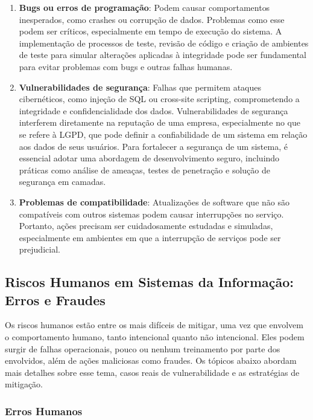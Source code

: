 \documentclass[12pt,oneside,a4paper,article]{abntex2}
\begin{document}
\begin{enumerate}
    \item \textbf{Bugs ou erros de programação}: Podem causar comportamentos inesperados, como crashes ou corrupção de dados. Problemas como esse podem ser críticos, especialmente em tempo de execução do sistema. A implementação de processos de teste, revisão de código e criação de ambientes de teste para simular alterações aplicadas à integridade pode ser fundamental para evitar problemas com bugs e outras falhas humanas.
    
    \item \textbf{Vulnerabilidades de segurança}: Falhas que permitem ataques cibernéticos, como injeção de SQL ou cross-site scripting, comprometendo a integridade e confidencialidade dos dados. Vulnerabilidades de segurança interferem diretamente na reputação de uma empresa, especialmente no que se refere à LGPD, que pode definir a confiabilidade de um sistema em relação aos dados de seus usuários. Para fortalecer a segurança de um sistema, é essencial adotar uma abordagem de desenvolvimento seguro, incluindo práticas como análise de ameaças, testes de penetração e solução de segurança em camadas.
    
    \item \textbf{Problemas de compatibilidade}: Atualizações de software que não são compatíveis com outros sistemas podem causar interrupções no serviço. Portanto, ações precisam ser cuidadosamente estudadas e simuladas, especialmente em ambientes em que a interrupção de serviços pode ser prejudicial.
\end{enumerate}



\newpage

\subsection {\textbf{Riscos Humanos em Sistemas da Informação: Erros e Fraudes}}


Os riscos humanos estão entre os mais difíceis de mitigar, uma vez que envolvem o comportamento humano, tanto intencional quanto não intencional. Eles podem surgir de falhas operacionais, pouco ou nenhum treinamento por parte dos envolvidos, além de ações maliciosas como fraudes. Os tópicos abaixo abordam mais detalhes sobre esse tema, casos reais de vulnerabilidade e as estratégias de mitigação.

\subsubsection{\textbf{Erros Humanos}}
\end{document}
